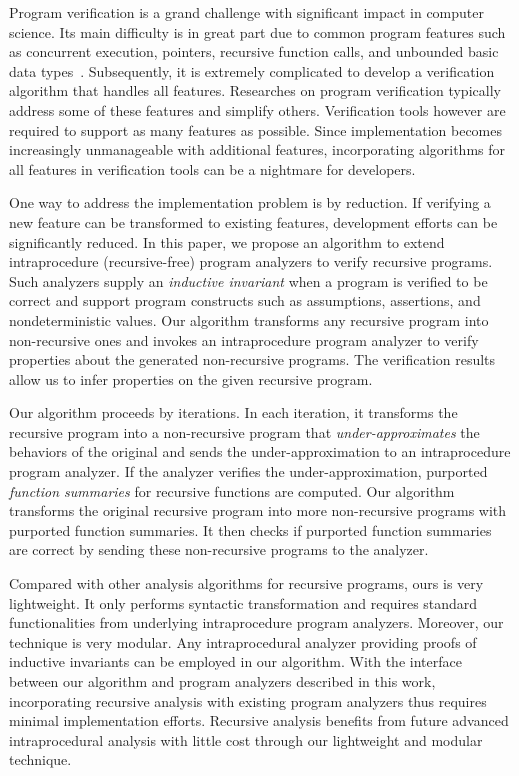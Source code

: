 Program verification is a grand challenge with significant impact in computer science.
Its main difficulty is in great part due to common program features such as concurrent execution,  pointers,  recursive function calls,  and unbounded basic data types~\cite{ClarkeJS05}. Subsequently, it is extremely complicated to develop a verification algorithm that handles all features. Researches on program verification typically address some of these features and simplify others. Verification tools however are required to support as many features as possible. Since implementation becomes increasingly unmanageable with additional features, incorporating algorithms for all features in verification tools can be a nightmare for developers.

One way to address the implementation problem is by reduction. If verifying a new feature can be transformed to existing features, development efforts can be significantly reduced.
In this paper, we propose an algorithm to extend intraprocedure (recursive-free) program analyzers to verify recursive programs. Such analyzers supply an \emph{inductive invariant} when a program is verified to be correct and support program constructs such as assumptions, assertions, and nondeterministic values. Our algorithm transforms any recursive program into non-recursive ones and invokes an intraprocedure program analyzer to verify properties about the generated non-recursive programs. The verification results allow us to infer properties on the given recursive program.

Our algorithm proceeds by iterations. In each iteration, it transforms the recursive program into a non-recursive program that \emph{under-approximates} the behaviors of the original and sends the under-approximation to an intraprocedure program analyzer. If the analyzer verifies the under-approximation, purported \emph{function summaries} for recursive functions are computed. Our algorithm transforms the original recursive program into more non-recursive programs with purported function summaries. It then checks if purported function summaries are correct by sending these non-recursive programs to the analyzer.

Compared with other analysis algorithms for recursive programs, ours is very lightweight. It only performs syntactic transformation and requires standard functionalities from underlying intraprocedure program analyzers. Moreover, our technique is very modular. Any intraprocedural analyzer providing proofs of inductive invariants can be employed in our algorithm. With the interface between our algorithm and program analyzers described in this work, incorporating recursive analysis with existing program analyzers thus requires minimal implementation efforts. Recursive analysis benefits from future advanced intraprocedural analysis with little cost through our lightweight and modular technique. 

